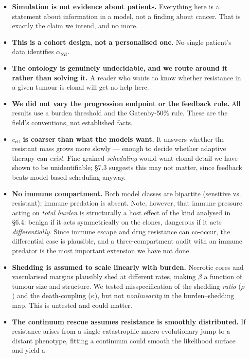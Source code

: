 \documentclass[11pt,a4paper]{article}
\newcommand{\ceff}{c_{\mathrm{eff}}}
\newcommand{\aSR}{\alpha_{SR}}
\begin{document}
\begin{itemize}[leftmargin=1.4em,itemsep=0.35em]
\item \textbf{Simulation is not evidence about patients.} Everything here is a
statement about information in a model, not a finding about cancer. That is exactly
the claim we intend, and no more.
\item \textbf{This is a cohort design, not a personalised one.} No single patient's
data identifies $\aSR$.
\item \textbf{The ontology is genuinely undecidable, and we route around it rather
than solving it.} A reader who wants to know whether resistance in a given tumour is
clonal will get no help here.
\item \textbf{We did not vary the progression endpoint or the feedback rule.} All
results use a burden threshold and the Gatenby-50\% rule. These are the field's
conventions, not established facts.
\item \textbf{$\ceff$ is coarser than what the models want.} It answers whether the
resistant mass grows more slowly --- enough to decide whether adaptive therapy can
\emph{exist}. Fine-grained \emph{scheduling} would want clonal detail we have shown
to be unidentifiable; \S7.3 suggests this may not matter, since feedback beats
model-based scheduling anyway.
\item \textbf{No immune compartment.} Both model classes are bipartite (sensitive
vs. resistant); immune predation is absent. Note, however, that immune pressure acting
on \emph{total burden} is structurally a host effect of the kind analysed in \S6.4:
benign if it acts symmetrically on the clones, dangerous if it acts
\emph{differentially}. Since immune escape and drug resistance can co-occur, the
differential case is plausible, and a three-compartment audit with an immune predator
is the most important extension we have not done.
\item \textbf{Shedding is assumed to scale linearly with burden.} Necrotic cores and
vascularised margins plausibly shed at different rates, making $\beta$ a function of
tumour size and structure. We tested misspecification of the shedding \emph{ratio}
($\rho$) and the death-coupling ($\kappa$), but not \emph{nonlinearity} in the
burden--shedding map. This is untested and could matter.
\item \textbf{The continuum rescue assumes resistance is smoothly distributed.} If
resistance arises from a single catastrophic macro-evolutionary jump to a distant
phenotype, fitting a continuum could smooth the likelihood surface and yield a

\end{itemize}
\end{document}
